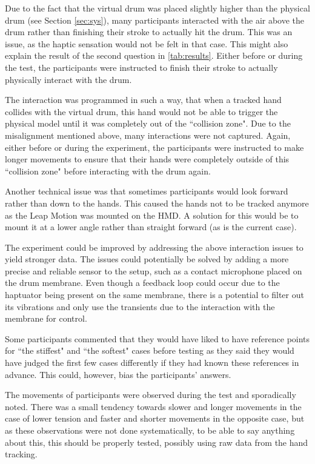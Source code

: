 \documentclass{article}
\begin{document}
Due to the fact that the virtual drum was placed slightly higher than the physical drum (see Section \ref{sec:sys}), many participants interacted with the air above the drum rather than finishing their stroke to actually hit the drum. This was an issue, as the haptic sensation would not be felt in that case. This might also explain the result of the second question in \autoref{tab:results}. Either before or during the test, the participants were instructed to finish their stroke to actually physically interact with the drum. 

The interaction was programmed in such a way, that when a tracked hand collides with the virtual drum, this hand would not be able to trigger the physical model until it was  completely out of the ``collision zone". Due to the misalignment mentioned above, many interactions were not captured. Again, either before or during the experiment, the participants were instructed to make longer movements to ensure that their hands were completely outside of this ``collision zone" before interacting with the drum again.

Another technical issue was that sometimes participants would look forward rather than down to the hands. This caused the hands not to be tracked anymore as the Leap Motion was mounted on the HMD. A solution for this would be to mount it at a lower angle rather than straight forward (as is the current case).

The experiment could be improved by addressing the above interaction issues to yield stronger data. The issues could potentially be solved by adding a more precise and reliable sensor to the setup, such as a contact microphone placed on the drum membrane. Even though a feedback loop could occur due to the haptuator being present on the same membrane, there is a potential to filter out its vibrations and only use the transients due to the interaction with the membrane for control.

Some participants commented that they would have liked to have reference points for ``the stiffest" and ``the softest" cases before testing as they said they would have judged the first few cases differently if they had known these references in advance. This could, however, bias the participants' answers.

The movements of participants were observed during the test and sporadically noted. There was a small tendency towards slower and longer movements in the case of lower tension and faster and shorter movements in the opposite case, but as these observations were not done systematically, to be able to say anything about this, this should be properly tested, possibly using raw data from the hand tracking.
\end{document}
